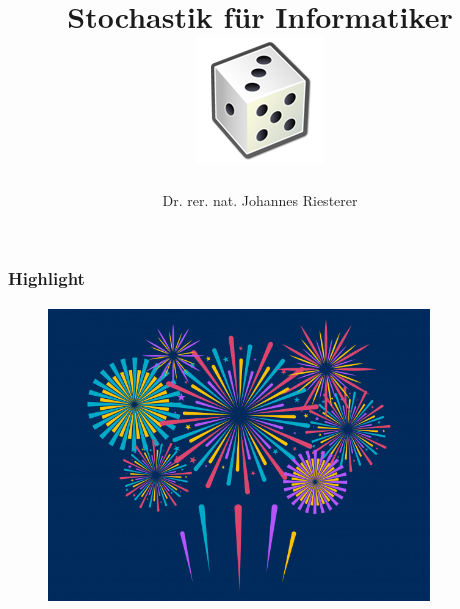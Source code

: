 \documentclass{beamer}
\begin{document}
\title[Stochastik] %
{Stochastik für Informatiker
\\
\includegraphics[scale=0.5]{img/craps}
}
\subtitle{}
\author[Dr. Johannes Riesterer] %
{Dr.  rer. nat. Johannes Riesterer}

\date[KPT 2004] %
{}

\subject{Stochastik}


\frame{\titlepage}


\begin{frame}
    \frametitle{Highlight}
\framesubtitle{}
\begin{figure}[htp]
      \centering
    \includegraphics[width=0.9\textwidth]{img/firework}
\end{figure}
 \end{frame}
\end{document}
